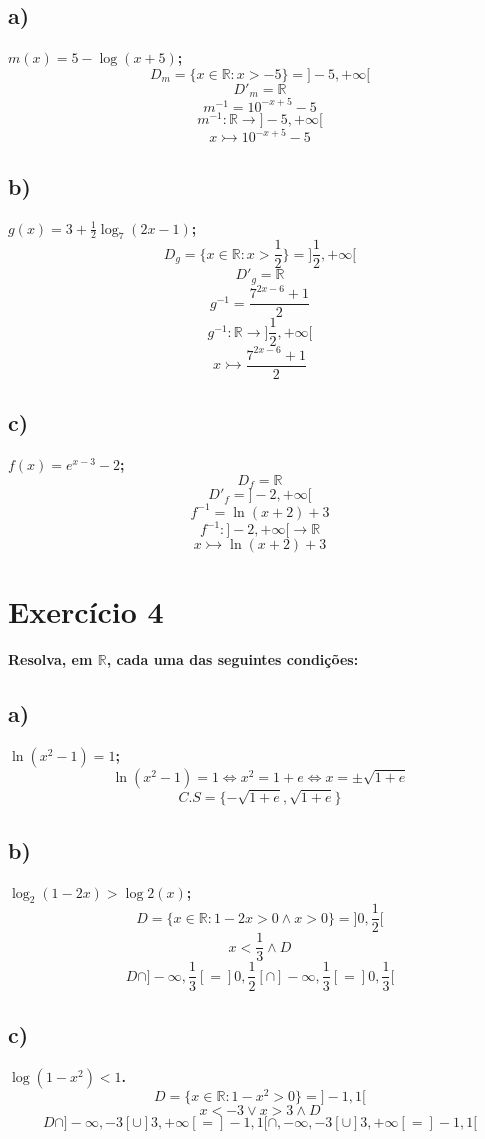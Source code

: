\documentclass[a4paper]{article}
\begin{document}
\subsection*{a)}\textbf{$m(x)=5 -\log(x+5)$;}
\[D_{m}=\{x \in \mathbb{R}: x > -5\}=]-5,+\infty[\]
\[D'_{m}=\mathbb{R}\]
\[m^{-1}=10^{-x+5}-5\]
\[m^{-1}:\mathbb{R}\rightarrow ]-5,+\infty[\]
\[x\rightarrowtail 10^{-x+5}-5\]

\subsection*{b)}\textbf{$g(x)=3 + \frac{1}{2}\log_{7}(2x-1)$;}
\[D_{g}=\{x \in \mathbb{R}: x > \frac{1}{2}\}=]\frac{1}{2},+\infty[\]
\[D'_{g}=\mathbb{R}\]
\[g^{-1}=\frac{7^{2x-6}+1}{2}\]
\[g^{-1}:\mathbb{R}\rightarrow ]\frac{1}{2},+\infty[\]
\[x\rightarrowtail \frac{7^{2x-6}+1}{2}\]

\subsection*{c)}\textbf{$f(x)=e^{x-3}-2$;}
\[D_{f}=\mathbb{R}\]
\[D'_{f}=]-2,+\infty[\]
\[f^{-1}=\ln{\left(x+2\right)}+3\]
\[f^{-1}:]-2,+\infty[\rightarrow \mathbb{R}\]
\[x\rightarrowtail \ln{\left(x+2\right)}+3\]

\section*{Exercício 4}\textbf{Resolva, em $\mathbb{R}$, cada uma das seguintes condições:}
\subsection*{a)}\textbf{$\ln(x^2-1)=1$;}
\[\ln(x^2-1)=1\Leftrightarrow x^2=1+e \Leftrightarrow x = \pm \sqrt{1+e}\]
\[C.S=\{-\sqrt{1+e},\sqrt{1+e}\}\]
\subsection*{b)}\textbf{$\log_{2}(1-2x) > \log{2}(x)$;}
\[D=\{x \in \mathbb{R}:1-2x > 0 \land x > 0\}=]0,\frac{1}{2}[\]
\[x < \frac{1}{3} \land D\]
\[D \cap ]-\infty,\frac{1}{3}[=]0,\frac{1}{2}[ \cap ]-\infty,\frac{1}{3}[ = ]0,\frac{1}{3}[ \]

\subsection*{c)}\textbf{$\log(1-x^2) < 1$.}
\[D=\{x \in \mathbb{R}:1-x^2 > 0\}=]-1,1[\]
\[x < -3 \lor x > 3 \land D\]
\[D \cap ]-\infty,-3[\cup ]3,+\infty[=]-1,1[ \cap ,-\infty,-3[\cup ]3,+\infty[ = ]-1,1[ \]
\end{document}
